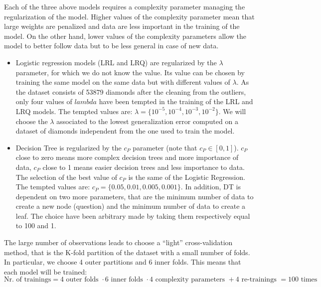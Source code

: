 \documentclass[
]{article}
\providecommand{\tightlist}{%
  \setlength{\itemsep}{0pt}\setlength{\parskip}{0pt}}
\begin{document}
Each of the three above models requires a complexity parameter managing
the regularization of the model. Higher values of the complexity
parameter mean that large weights are penalized and data are less
important in the training of the model. On the other hand, lower values
of the complexity parameters allow the model to better follow data but
to be less general in case of new data.

\begin{itemize}
\tightlist
\item
  Logistic regression models (LRL and LRQ) are regularized by the
  \(\lambda\) parameter, for which we do not know the value. Its value
  can be chosen by training the same model on the same data but with
  different values of \(\lambda\). As the dataset consists of 53879
  diamonds after the cleaning from the outliers, only four values of
  \(lambda\) have been tempted in the training of the LRL and LRQ
  models. The tempted values are:
  \(\lambda=\{10^{-5},10^{-4},10^{-3},10^{-2}\}\). We will choose the
  \(\lambda\) associated to the lowest generalization error computed on
  a dataset of diamonds independent from the one used to train the
  model.
\item
  Decision Tree is regularized by the \(c_P\) parameter (note that
  \(c_P\in[0,1]\)). \(c_P\) close to zero means more complex decision
  trees and more importance of data, \(c_P\) close to 1 means easier
  decision trees and less importance to data. The selection of the best
  value of \(c_P\) is the same of the Logistic Regression. The tempted
  values are: \(c_P=\{0.05,0.01,0.005,0.001\}\). In addition, DT is
  dependent on two more parameters, that are the minimum number of data
  to create a new node (question) and the minimum number of data to
  create a leaf. The choice have been arbitrary made by taking them
  respectively equal to 100 and 1.
\end{itemize}

The large number of observations leads to choose a ``light''
cross-validation method, that is the K-fold partition of the dataset
with a small number of folds. In particular, we choose 4 outer
partitions and 6 inner folds. This means that each model will be
trained: \[
\text{Nr. of trainings} = 4 \text{ outer folds } \cdot 6 \text{ inner folds } \cdot 4 \text{ complexity parameters } + 4 \text{ re-trainings } = 100 \text{ times}
\]
\end{document}
